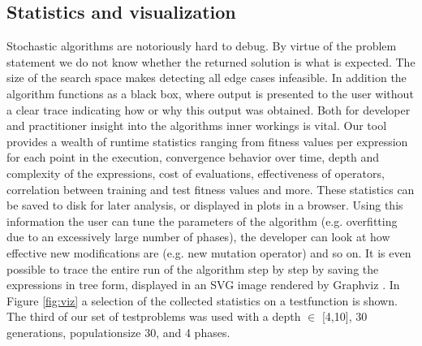 \subsection{Statistics and visualization}
Stochastic algorithms are notoriously hard to debug. By virtue of the problem statement we do not know whether the returned solution is what is expected. The size of the search space makes detecting all edge cases infeasible. In addition the algorithm functions as a black box, where output is presented to the user without a clear trace indicating how or why this output was obtained. Both for developer and practitioner insight into the algorithms inner workings is vital. 
Our tool provides a wealth of runtime statistics ranging from fitness values per expression for each point in the execution, convergence behavior over time, depth and complexity of the expressions, cost of evaluations, effectiveness of operators, correlation between training and test fitness values and more. These statistics can be saved to disk for later analysis, or displayed in plots in a browser. Using this information the user can tune the parameters of the algorithm (e.g. overfitting due to an excessively large number of phases), the developer can look at how effective new modifications are (e.g. new mutation operator) and so on.
It is even possible to trace the entire run of the algorithm step by step by saving the expressions in tree form, displayed in an SVG image rendered by Graphviz \cite{graphviz}. In Figure \ref{fig:viz} a selection of the collected statistics on a testfunction is shown. The third of our set of testproblems was used with a depth $\in$ [4,10], 30 generations, populationsize 30, and 4 phases.
